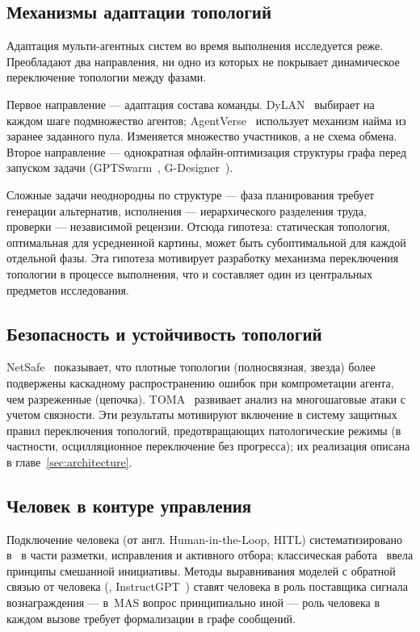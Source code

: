 \subsection{Механизмы адаптации топологий}
\label{sec:rev:adaptation}

Адаптация мульти-агентных систем во время выполнения исследуется
реже. Преобладают два направления, ни одно из которых не
покрывает динамическое переключение топологии между фазами.

Первое направление --- адаптация состава команды.
DyLAN~\cite{liu2023} выбирает на каждом шаге подмножество агентов;
AgentVerse~\cite{agentverse2023} использует механизм найма
из заранее заданного пула. Изменяется множество участников,
а не схема обмена. Второе направление --- однократная офлайн-оптимизация
структуры графа перед запуском задачи (GPTSwarm~\cite{zhuge2024},
G-Designer~\cite{zhang2024}).

Сложные задачи неоднородны по структуре --- фаза планирования
требует генерации альтернатив, исполнения --- иерархического
разделения труда, проверки --- независимой рецензии. Отсюда
гипотеза: статическая топология, оптимальная для усредненной
картины, может быть субоптимальной для каждой отдельной фазы.
Эта гипотеза мотивирует разработку механизма переключения
топологии в процессе выполнения, что и составляет один из
центральных предметов исследования.

\subsection{Безопасность и устойчивость топологий}
\label{sec:rev:safety}

NetSafe~\cite{yu2024} показывает, что плотные топологии
(полносвязная, звезда) более подвержены каскадному распространению
ошибок при компрометации агента, чем разреженные (цепочка).
TOMA~\cite{liang2024} развивает анализ на многошаговые атаки
с учетом связности. Эти результаты мотивируют включение в
систему защитных правил переключения топологий, предотвращающих
патологические режимы (в частности, осцилляционное переключение
без прогресса); их реализация описана в главе~\ref{sec:architecture}.

\subsection{Человек в контуре управления}
\label{sec:rev:hitl}

Подключение человека (от англ. Human-in-the-Loop, HITL)
систематизировано в~\cite{mosqueira2023} в части разметки,
исправления и активного отбора; классическая
работа~\cite{horvitz1999} ввела принципы смешанной инициативы.
Методы выравнивания моделей с обратной связью от человека
(\cite{christiano2017}, InstructGPT~\cite{ouyang2022}) ставят
человека в роль поставщика сигнала вознаграждения --- в~MAS
вопрос принципиально иной --- роль человека в каждом вызове
требует формализации в графе сообщений.

